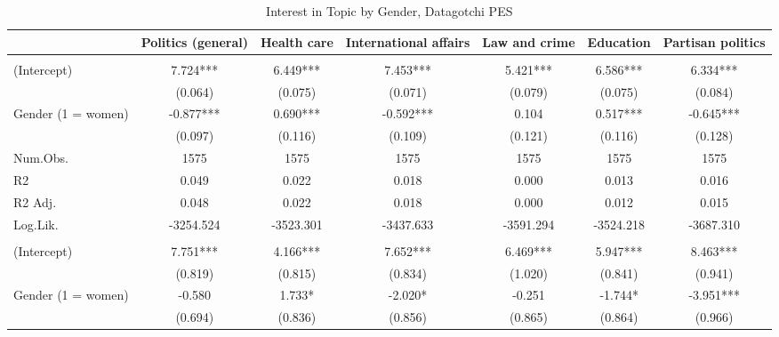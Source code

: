 \documentclass[
  letterpaper,
  DIV=11,
  numbers=noendperiod]{scrreprt}
\begin{document}
\begin{table}
\centering\centering
\caption{Interest in Topic by Gender, Datagotchi PES \label{tab:olsInterestDG}}
\centering
\fontsize{6}{8}\selectfont
\begin{tabular}[t]{lcccccc}
\toprule
  & Politics (general) & Health care & International affairs & Law and crime & Education & Partisan politics\\
\midrule
\addlinespace[0.5em]
\multicolumn{7}{l}{\textit{Without Controls}}\\
\midrule \hspace{1em}(Intercept) & 7.724*** & 6.449*** & 7.453*** & 5.421*** & 6.586*** & 6.334***\\
\hspace{1em} & (0.064) & (0.075) & (0.071) & (0.079) & (0.075) & (0.084)\\
\hspace{1em}Gender (1 = women) & -0.877*** & 0.690*** & -0.592*** & 0.104 & 0.517*** & -0.645***\\
\hspace{1em} & (0.097) & (0.116) & (0.109) & (0.121) & (0.116) & (0.128)\\
\hspace{1em}Num.Obs. & 1575 & 1575 & 1575 & 1575 & 1575 & \vphantom{1} 1575\\
\hspace{1em}R2 & 0.049 & 0.022 & 0.018 & 0.000 & 0.013 & 0.016\\
\hspace{1em}R2 Adj. & 0.048 & 0.022 & 0.018 & 0.000 & 0.012 & 0.015\\
\hspace{1em}Log.Lik. & -3254.524 & -3523.301 & -3437.633 & -3591.294 & -3524.218 & -3687.310\\
\addlinespace[0.5em]
\multicolumn{7}{l}{\textit{With Controls}}\\
\midrule \hspace{1em}(Intercept) & 7.751*** & 4.166*** & 7.652*** & 6.469*** & 5.947*** & 8.463***\\
\hspace{1em} & (0.819) & (0.815) & (0.834) & (1.020) & (0.841) & (0.941)\\
\hspace{1em}Gender (1 = women) & -0.580 & 1.733* & -2.020* & -0.251 & -1.744* & -3.951***\\
\hspace{1em} & (0.694) & (0.836) & (0.856) & (0.865) & (0.864) & (0.966)\\

\end{tabular}
\end{table}
\end{document}
